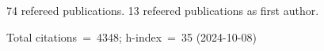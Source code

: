 74 refereed publications. 13 refeered publications as first author.

Total citations~=~4348; h-index~=~35 (2024-10-08)